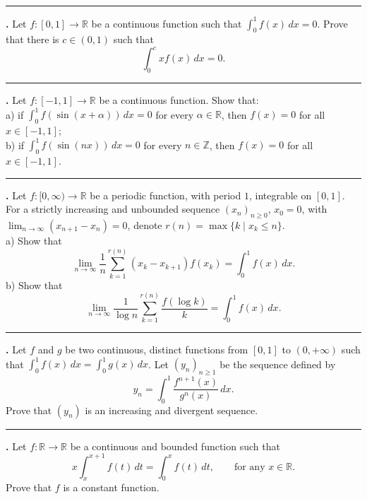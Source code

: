 \documentclass[11pt]{article}
\newcounter{probnum}
\newenvironment{problembox}{\par\noindent\rule{\linewidth}{0.5pt}\vspace{5pt}\par}{\vspace{2pt}}
\begin{document}
\begin{problembox}
\textbf{\theprobnum.} Let $f : [0,1] \to \mathbb{R}$ be a continuous function such that $\displaystyle\int_0^1 f(x)\,dx = 0$. Prove that there is $c \in (0,1)$ such that
\[
\int_0^c x f(x)\,dx = 0.
\]
\end{problembox}

\begin{problembox}
\textbf{\theprobnum.} Let $f : [-1,1] \to \mathbb{R}$ be a continuous function. Show that:\\
a) if $\displaystyle\int_0^1 f(\sin(x+\alpha))\,dx = 0$ for every $\alpha \in \mathbb{R}$, then $f(x) = 0$ for all $x \in [-1,1]$;\\
b) if $\displaystyle\int_0^1 f(\sin(nx))\,dx = 0$ for every $n \in \mathbb{Z}$, then $f(x) = 0$ for all $x \in [-1,1]$.
\end{problembox}

\begin{problembox}
\textbf{\theprobnum.} Let $f : [0,\infty) \to \mathbb{R}$ be a periodic function, with period $1$, integrable on $[0,1]$. For a strictly increasing and unbounded sequence $(x_n)_{n \ge 0}$, $x_0 = 0$, with $\displaystyle\lim_{n \to \infty} (x_{n+1}-x_n) = 0$, denote $r(n) = \max\{k \mid x_k \le n\}$.\\
a) Show that
\[
\lim_{n \to \infty} \frac{1}{n} \sum_{k=1}^{r(n)} (x_k - x_{k+1}) f(x_k) = \int_0^1 f(x)\,dx.
\]
b) Show that
\[
\lim_{n \to \infty} \frac{1}{\log n} \sum_{k=1}^{r(n)} \frac{f(\log k)}{k} = \int_0^1 f(x)\,dx.
\]
\end{problembox}

\begin{problembox}
\textbf{\theprobnum.} Let $f$ and $g$ be two continuous, distinct functions from $[0,1]$ to $(0,+\infty)$ such that $\displaystyle\int_0^1 f(x)\,dx = \int_0^1 g(x)\,dx$. Let $(y_n)_{n \ge 1}$ be the sequence defined by
\[
y_n = \int_0^1 \frac{f^{n+1}(x)}{g^n(x)}\,dx.
\]
Prove that $(y_n)$ is an increasing and divergent sequence.
\end{problembox}

\begin{problembox}
\textbf{\theprobnum.} Let $f : \mathbb{R} \to \mathbb{R}$ be a continuous and bounded function such that
\[
x \int_x^{x+1} f(t)\,dt = \int_0^x f(t)\,dt, \qquad \text{for any } x \in \mathbb{R}.
\]
Prove that $f$ is a constant function.
\end{problembox}
\end{document}
